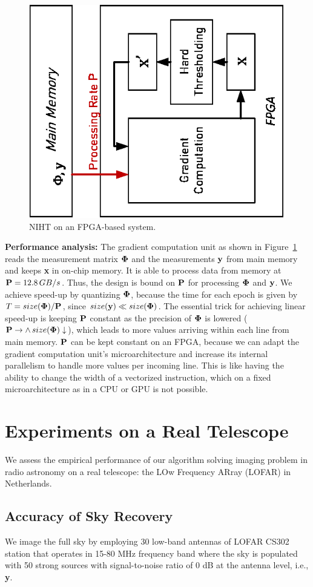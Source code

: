 \documentclass{article}
\begin{document}
\begin{figure}[h!]
\centering
\includegraphics[width=0.5\columnwidth, angle=270]{figs/niht_fpga.eps}
\caption{NIHT on an FPGA-based system.}
\label{fig:fpga}
\end{figure}


{\bf Performance analysis:} The gradient computation unit as shown in Figure~\ref{fig:fpga} reads the measurement matrix ${\bf \Phi}$ and the measurements ${\bf y}$ from main memory and keeps {\bf x} in on-chip memory. It is able to process data from memory at ${\bf P}=12.8\,GB/s$. Thus, the design is bound on ${\bf P}$ for processing ${\bf \Phi}$ and ${\bf y}$. We achieve speed-up by quantizing ${\bf \Phi}$, because the time for each epoch is given by
$T = size({\bf \Phi})/{\bf P}$, since $size({\bf y}) \ll size({\bf \Phi})$. The essential trick for achieving linear speed-up is keeping ${\bf P}$ constant as the precision of ${\bf \Phi}$ is lowered (${\bf P}\to \land \, size({\bf \Phi})\downarrow$), which leads to more values arriving within each line from main memory. ${\bf P}$ can be kept constant on an FPGA, because we can adapt the gradient computation unit's microarchitecture and increase its internal parallelism to handle more values per incoming line. This is like having the ability to change the width of a vectorized instruction, which on a fixed microarchitecture as in a CPU or GPU is not possible.



\section{Experiments on a Real Telescope}
We assess the empirical performance of our algorithm solving imaging problem in radio astronomy on a real telescope: the LOw Frequency ARray (LOFAR) in Netherlands.
\subsection{Accuracy of Sky Recovery}
We image the full sky by employing 30 low-band antennas of LOFAR CS302 station that operates in 15-80 MHz frequency band where the sky is populated with 50 strong sources with signal-to-noise ratio of 0 dB at the antenna level, i.e., {\bf y}. 
\end{document}

